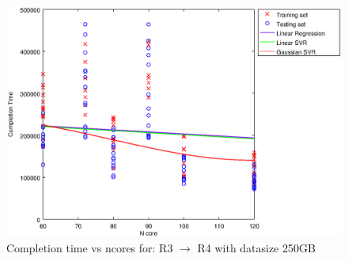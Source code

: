 
\begin {figure}[hbtp]
\centering
\includegraphics[width=\textwidth]{output/R3_R4_250_ALL_FEATURES/plot_R3_R4_250_bestmodels.eps}
\caption{Completion time vs ncores for: R3 $\rightarrow$ R4 with datasize 250GB}
\label{fig:coreonly_linear_R3_R4_250}
\end {figure}
